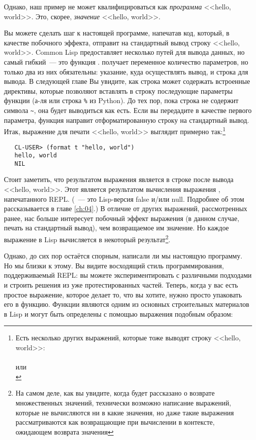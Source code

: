 Однако, наш пример не может квалифицироваться как \emph{программа} <<hello, world>>.
Это, скорее, \emph{значение} <<hello, world>>.

Вы можете сделать шаг к настоящей программе, напечатав код, который, в качестве побочного
эффекта, отправит на стандартный вывод строку <<hello, world>>. Common Lisp предоставляет
несколько путей для вывода данных, но самый гибкий~--- это функция .  получает
переменное количество параметров, но только два из них обязательны: указание, куда
осуществлять вывод, и строка для вывода. В следующей главе Вы увидите, как строка может
содержать встроенные директивы, которые позволяют вставлять в строку последующие параметры
функции (а-ля  или строка \lstinline|%| из Python). До тех пор, пока строка
не содержит символа \lstinline|~|, она будет выводиться как есть. Если вы передадите  в
качестве первого параметра, функция  направит отформатированную строку на
стандартный вывод. Итак, выражение  для печати <<hello, world>> выглядит примерно
так:\footnote{Есть несколько других выражений, которые тоже выводят строку <<hello, world>>:\\
   \\
  или \\
  }

\begin{verbatim}
   CL-USER> (format t "hello, world")
   hello, world
   NIL
\end{verbatim}

Стоит заметить, что результатом выражения  является  в строке после
вывода <<hello, world>>. Этот  является результатом вычисления выражения ,
напечатанного REPL. (~--- это Lisp-версия false и/или null. Подробнее об этом
рассказывается в главе \ref{ch:04}.) В отличие от других выражений, рассмотренных ранее, нас больше
интересует побочный эффект выражения  (в данном случае, печать на стандартный
вывод), чем возвращаемое им значение. Но каждое выражение в Lisp вычисляется в некоторый
результат\footnote{На самом деле, как вы увидите, когда будет рассказано о возврате
  множественных значений, технически возможно написание выражений, которые не вычисляются
  ни в какие значения, но даже такие выражения рассматриваются как возвращающие  при
  вычислении в контексте, ожидающем возврата значения}.

Однако, до сих пор остаётся спорным, написали ли мы настоящую программу. Но мы близки к этому.
Вы видите восходящий стиль программирования, поддерживаемый REPL: вы можете
экспериментировать с различными подходами и строить решения из уже протестированных
частей. Теперь, когда у вас есть простое выражение, которое делает то, что вы хотите,
нужно просто упаковать его в функцию. Функции являются одним из основных строительных
материалов в Lisp и могут быть определены с помощью выражения  подобным образом:

